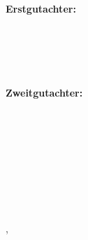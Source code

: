\begin{minipage}[t]{.27\textwidth}
	\raggedleft
	\textbf{Erstgutachter:}
\end{minipage}
\hspace*{25pt}
\begin{minipage}[t]{.40\textwidth}
	{\Large \thesisFirstReviewer} \\
	{\small \thesisFirstReviewerUniversity} \\[-1mm]
	{\small \thesisFirstReviewerCity}
\end{minipage} \\[5mm]
\begin{minipage}[t]{.27\textwidth}
	\raggedleft
	\textbf{Zweitgutachter:}
\end{minipage}
\hspace*{25pt}
\begin{minipage}[t]{.40\textwidth}
	{\Large \thesisSecondReviewer} \\
	{\small \thesisSecondReviewerUniversity} \\[-1mm]
	{\small \thesisSecondReviewerCity}
\end{minipage} \\[10mm]
\begin{minipage}[t]{.27\textwidth}
	\raggedleft
	\textbf{}
\end{minipage}
\hspace*{25pt}
\begin{minipage}[t]{.40\textwidth}
	\thesisDefense %
\end{minipage} \\[10mm]


\vfill
{
	\small
	\textbf{\thesisDegree\ \thesisName} \\
	\textit{\thesisTitle} \\
	\thesisSubject, \thesisDate \\[1.0em]
	\textbf{\thesisOrganization} \\
	\thesisOrganizationDepartment \\
	\textit{\thesisOrganizationGroup} \\
	\thesisOrganizationStreetAddress \\
	\thesisOrganizationPostalCode\ \thesisOrganizationCity \\[1.0em]
	\textbf{\thesisUniversity} \\
	\thesisUniversityDepartment \\
	\thesisUniversityInstitute \\
	\textit{\thesisUniversityGroup} \\
	\thesisUniversityStreetAddress \\
	\thesisUniversityPostalCode\ \thesisUniversityCity

}
